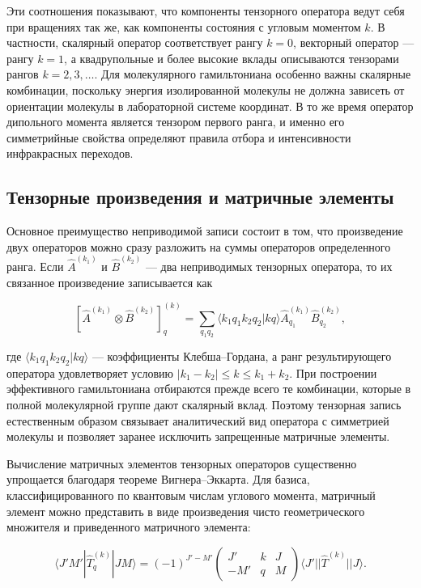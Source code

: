 Эти соотношения показывают, что компоненты тензорного оператора ведут себя
при вращениях так же, как компоненты состояния с угловым моментом $k$. В
частности, скалярный оператор соответствует рангу $k=0$, векторный оператор
--- рангу $k=1$, а квадрупольные и более высокие вклады описываются
тензорами рангов $k=2,3,\ldots$. Для молекулярного гамильтониана особенно
важны скалярные комбинации, поскольку энергия изолированной молекулы не
должна зависеть от ориентации молекулы в лабораторной системе координат. В
то же время оператор дипольного момента является тензором первого ранга, и
именно его симметрийные свойства определяют правила отбора и интенсивности
инфракрасных переходов.

\subsection{Тензорные произведения и матричные элементы}

Основное преимущество неприводимой записи состоит в том, что произведение
двух операторов можно сразу разложить на суммы операторов определенного
ранга. Если $\hat{A}^{(k_1)}$ и $\hat{B}^{(k_2)}$ --- два неприводимых
тензорных оператора, то их связанное произведение записывается как

\begin{equation}
\left[\hat{A}^{(k_1)}\otimes \hat{B}^{(k_2)}\right]^{(k)}_q=
\sum_{q_1q_2}
\langle k_1q_1k_2q_2|kq\rangle
\hat{A}^{(k_1)}_{q_1}\hat{B}^{(k_2)}_{q_2},
\end{equation}

где $\langle k_1q_1k_2q_2|kq\rangle$ --- коэффициенты Клебша--Гордана, а
ранг результирующего оператора удовлетворяет условию
$|k_1-k_2|\leq k\leq k_1+k_2$. При построении эффективного гамильтониана
отбираются прежде всего те комбинации, которые в полной молекулярной группе
дают скалярный вклад. Поэтому тензорная запись естественным образом
связывает аналитический вид оператора с симметрией молекулы и позволяет
заранее исключить запрещенные матричные элементы.

Вычисление матричных элементов тензорных операторов существенно упрощается
благодаря теореме Вигнера--Эккарта. Для базиса, классифицированного по
квантовым числам углового момента, матричный элемент можно представить в
виде произведения чисто геометрического множителя и приведенного матричного
элемента:

\begin{equation}
\langle J'M'|\hat{T}^{(k)}_q|JM\rangle =
(-1)^{J'-M'}
\begin{pmatrix}
J' & k & J\\
-M' & q & M
\end{pmatrix}
\langle J'||\hat{T}^{(k)}||J\rangle .
\end{equation}


